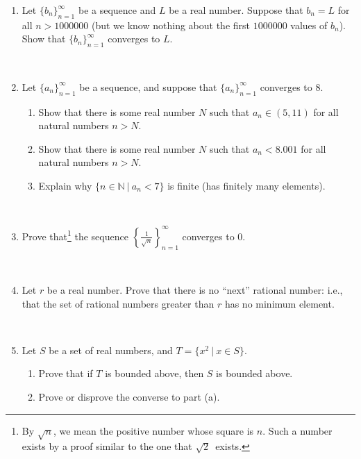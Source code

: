 \documentclass{amsart}
\def\N{\mathbb N}
\def\ds{\displaystyle}
\begin{document}
\begin{enumerate}
 \item Let $\{b_n\}_{n=1}^\infty$ be a sequence and $L$ be a real number. Suppose that $b_n = L$ for all $n >  1000000$ (but we know nothing about the first $1000000$ values of $b_n$). Show that $\{b_n\}_{n=1}^\infty$ converges to $L$.
 
 \



\item Let $\{a_n\}_{n=1}^\infty$ be a sequence, and suppose that $\{a_n\}_{n=1}^\infty$  converges to $8$.
\begin{enumerate}
\item Show that there is some real number $N$ such that $a_n\in (5,11)$ for all natural numbers $n>N$.
\item Show that there is some real number $N$ such that $a_n < 8.001 $ for all natural numbers $n>N$.
\item Explain why $\{ n\in \N \ | \ a_n < 7\}$ is finite (has finitely many elements).
\end{enumerate}

\

\item Prove that\footnote{By $\sqrt{n}$, we mean the positive number whose square is $n$. Such a number exists by a proof similar to the one that $\sqrt{2}$~exists.} the sequence $\ds \left\{ \frac{1}{\sqrt{n}} \right\}_{n=1}^\infty$ converges to $0$.

\

\item Let $r$ be a real number. Prove that there is no ``next'' rational number: i.e., that the set of rational numbers greater than $r$ has no minimum element.

\

\item Let $S$ be a set of real numbers, and $T=\{ x^2 \ | \ x\in S\}$.
\begin{enumerate}
\item Prove that if $T$ is bounded above, then $S$ is bounded above.
\item Prove or disprove the converse to part (a).
\end{enumerate}



\end{enumerate}
\end{document}
